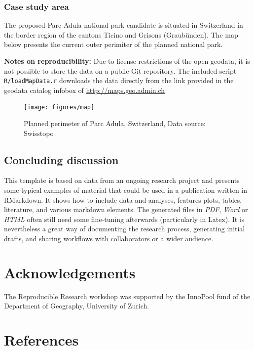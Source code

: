 \documentclass[]{article}
\begin{document}
\subsubsection{Case study area}\label{case-study-area}

The proposed Parc Adula national park candidate is situated in
Switzerland in the border region of the cantons Ticino and Grisons
(Graubünden). The map below presents the current outer perimiter of the
planned national park.

\textbf{Notes on reproducibility:} Due to license restrictions of the
open geodata, it is not possible to store the data on a public Git
repository. The included script \texttt{R/loadMapData.r} downloads the
data directly from the link provided in the geodata catalog infobox of
\url{http://maps.geo.admin.ch}

\begin{figure}
\texttt{[image: figures/map]} \caption{Planned perimeter of Parc Adula, Switzerland, Data source: Swisstopo}\label{fig:map}
\end{figure}

\subsection{Concluding discussion}\label{concluding-discussion}

This template is based on data from an ongoing research project and
presents some typical examples of material that could be used in a
publication written in RMarkdown. It shows how to include data and
analyses, features plots, tables, literature, and various markdown
elements. The generated files in \emph{PDF}, \emph{Word} or \emph{HTML}
often still need some fine-tuning afterwards (particularly in Latex). It
is nevertheless a great way of documenting the research process,
generating initial drafts, and sharing workflows with collaborators or a
wider audience.

\section{Acknowledgements}\label{acknowledgements}

The Reproducible Research workshop was supported by the InnoPool fund of
the Department of Geography, University of Zurich.

\section*{References}\label{references}
\end{document}
